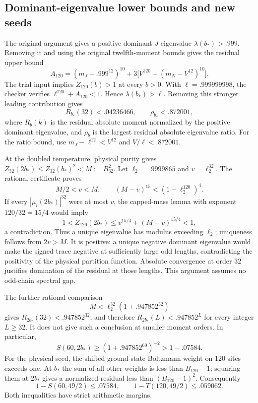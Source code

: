 \documentclass[11pt,a4paper]{article}
\begin{document}
\subsection{Dominant-eigenvalue lower bounds and new seeds}
The original argument gives a positive dominant $J$ eigenvalue
$\lambda(b_*)>.999$. Removing it and using the original twelfth-moment
bounds gives the residual upper bound
\[
 A_{120}=(m_J-.999^{12})^{10}
          +3\bigl[V^{120}+(m_N-V^{12})^{10}\bigr].
\]
The trial input implies $Z_{120}(b)>1$ at every $b>0$.
With $\ell=.999999998$, the checker verifies
$\ell^{120}+A_{120}<1$. Hence $\lambda(b_*)>\ell$.
Removing this stronger leading contribution gives
\begin{equation}\label{eq:spectral-short-tail}
 R_{b_*}(32)<.04236466,\qquad \rho_{b_*}<.872001,
\end{equation}
where $R_b(k)$ is the residual absolute moment normalized by the
positive dominant eigenvalue, and $\rho_b$ is the largest residual
absolute eigenvalue ratio. For the ratio bound, use
$m_J-\ell^{12}<V^{12}$ and $V/\ell<.872001$.

At the doubled temperature, physical purity gives
$Z_{32}(2b_*)\le Z_{32}(b_*)^2<M:=B_{32}^2$.
Let $\ell_2=.9999865$ and $v=\ell_2^{32}$.
The rational certificate proves
\begin{equation}\label{eq:spectral-dominance-check}
 M/2<v<M,\qquad (M-v)^{15}<(1-\ell_2^{120})^4.
\end{equation}
If every $|\mu_i(2b_*)|^{32}$ were at most $v$, the capped-mass lemma
with exponent $120/32=15/4$ would imply
\[
 1<Z_{120}(2b_*)\le v^{15/4}+(M-v)^{15/4}<1,
\]
a contradiction. Thus a unique eigenvalue has modulus exceeding
$\ell_2$; uniqueness follows from $2v>M$.
It is positive: a unique negative dominant eigenvalue would make the
signed trace negative at sufficiently large odd lengths, contradicting
the positivity of the physical partition function. Absolute convergence
at order $32$ justifies domination of the residual at those lengths.
This argument assumes no odd-chain spectral gap.

The further rational comparison
\[
 M<\ell_2^{32}(1+.947852^{32})
\]
gives $R_{2b_*}(32)<.947852^{32}$, and therefore
$R_{2b_*}(L)<.947852^L$ for every integer $L\ge32$.
It does not give such a conclusion at smaller moment orders.
In particular,
\[
 S(60,2b_*)\ge(1+.947852^{60})^{-2}>1-.07584.
\]
For the physical seed, the shifted ground-state Boltzmann weight on
120 sites exceeds one. At $b_*$ the sum of all other weights is less
than $B_{120}-1$; squaring them at $2b_*$ gives a normalized residual
less than $(B_{120}-1)^2$. Consequently
\begin{equation}\label{eq:spectral-seeds}
 1-S(60,49/2)\le .07584,\qquad
 1-T(120,49/2)\le .059062.
\end{equation}
Both inequalities have strict arithmetic margins.
\end{document}
